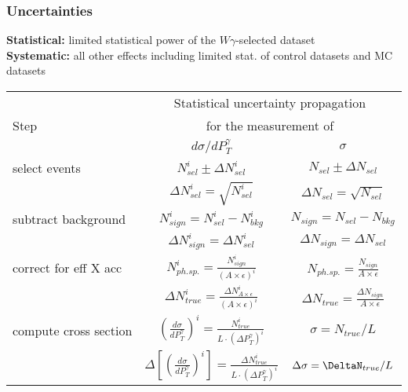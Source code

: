 \begin{frame}\frametitle{Uncertainties}
\scriptsize{\bfseries{Statistical:}} \tiny{limited statistical power of the $W\gamma$-selected dataset}\\
\scriptsize{\bfseries{Systematic:}} \tiny{all other effects including limited stat. of control datasets and MC datasets}\\

  \begin{table}[h]
  \tiny
  \begin{center}
  \begin{tabular}{|l|c|c|}
    \hline
          & \multicolumn{2}{|c|}{Statistical uncertainty propagation} \\ 
     Step & \multicolumn{2}{|c|}{for the measurement of} \\
          & $d\sigma/dP_{T}^{\gamma}$ & $\sigma$ \\ \hline

    select events & $N_{sel}^i \pm \Delta N_{sel}^i$ &    $N_{sel} \pm \Delta N_{sel}$       \\ 
                  & {\color{blue}$\Delta N_{sel}^i = \sqrt{N_{sel}^i}$} &  {\color{blue}$\Delta N_{sel} = \sqrt{N_{sel}}$}   \\ \hline

    subtract background & $N_{sign}^i = N_{sel}^i - N_{bkg}^i$ &    $N_{sign}=N_{sel}-N_{bkg}$       \\ 
                        & {\color{blue}$\Delta N_{sign}^i = \Delta N_{sel}^i$} &    {\color{blue}$\Delta N_{sign} = \Delta N_{sel}$}   \\ \hline

    correct for eff X acc & $N_{ph.sp.}^i = \frac{N_{sign}^i}{(A \times\epsilon)^i}$ &  $N_{ph.sp.}=\frac{N_{sign}}{A\times\epsilon}$       \\ 
                          & {\color{blue}$\Delta N_{true}^i = \frac{\Delta N_{A\times\epsilon}^i}{(A \times\epsilon)^i}$} &  {\color{blue}$\Delta N_{true}=\frac{\Delta N_{sign}}{A\times\epsilon}$}       \\ \hline

    compute cross section & $ \left( \frac{d\sigma}{dP_{T}^\gamma} \right) ^i = \frac{N_{true}^i}{L \cdot (\Delta P_T^\gamma)^i}$  &  $\sigma = N_{true}/L$       \\ 
                          & {\color{blue}$ \Delta \left[ \left( \frac{d\sigma}{dP_{T}^\gamma} \right) ^i \right]= \frac{\Delta N_{true}^i}{L \cdot (\Delta P_T^\gamma)^i}$ } &  {\color{blue}$\Delta\sigma = \DeltaN_{true}/L$   }    \\ \hline

  \end{tabular}
  \end{center}
\end{table}

\end{frame}%

